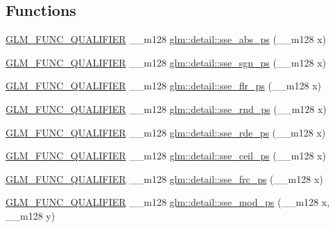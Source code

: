 \subsection*{Functions}
\begin{DoxyCompactItemize}
\item 
\hyperlink{setup_8hpp_a33fdea6f91c5f834105f7415e2a64407}{G\+L\+M\+\_\+\+F\+U\+N\+C\+\_\+\+Q\+U\+A\+L\+I\+F\+I\+ER} \+\_\+\+\_\+m128 \hyperlink{namespaceglm_1_1detail_a982958b357bf2f13229270c69be7b02b}{glm\+::detail\+::sse\+\_\+abs\+\_\+ps} (\+\_\+\+\_\+m128 x)
\item 
\hyperlink{setup_8hpp_a33fdea6f91c5f834105f7415e2a64407}{G\+L\+M\+\_\+\+F\+U\+N\+C\+\_\+\+Q\+U\+A\+L\+I\+F\+I\+ER} \+\_\+\+\_\+m128 \hyperlink{namespaceglm_1_1detail_a67933cf6687025e0841dce5f8ebe1892}{glm\+::detail\+::sse\+\_\+sgn\+\_\+ps} (\+\_\+\+\_\+m128 x)
\item 
\hyperlink{setup_8hpp_a33fdea6f91c5f834105f7415e2a64407}{G\+L\+M\+\_\+\+F\+U\+N\+C\+\_\+\+Q\+U\+A\+L\+I\+F\+I\+ER} \+\_\+\+\_\+m128 \hyperlink{namespaceglm_1_1detail_a3d303480575075ea1e56a02b19b2af8e}{glm\+::detail\+::sse\+\_\+flr\+\_\+ps} (\+\_\+\+\_\+m128 x)
\item 
\hyperlink{setup_8hpp_a33fdea6f91c5f834105f7415e2a64407}{G\+L\+M\+\_\+\+F\+U\+N\+C\+\_\+\+Q\+U\+A\+L\+I\+F\+I\+ER} \+\_\+\+\_\+m128 \hyperlink{namespaceglm_1_1detail_a3f07185bf2c0f4e6f6870b076d89d0c1}{glm\+::detail\+::sse\+\_\+rnd\+\_\+ps} (\+\_\+\+\_\+m128 x)
\item 
\hyperlink{setup_8hpp_a33fdea6f91c5f834105f7415e2a64407}{G\+L\+M\+\_\+\+F\+U\+N\+C\+\_\+\+Q\+U\+A\+L\+I\+F\+I\+ER} \+\_\+\+\_\+m128 \hyperlink{namespaceglm_1_1detail_a3d6f7ff87ee8764fa4a3c83ecf6a7a9e}{glm\+::detail\+::sse\+\_\+rde\+\_\+ps} (\+\_\+\+\_\+m128 x)
\item 
\hyperlink{setup_8hpp_a33fdea6f91c5f834105f7415e2a64407}{G\+L\+M\+\_\+\+F\+U\+N\+C\+\_\+\+Q\+U\+A\+L\+I\+F\+I\+ER} \+\_\+\+\_\+m128 \hyperlink{namespaceglm_1_1detail_a907280f32258c4f9657282bcd6527d60}{glm\+::detail\+::sse\+\_\+ceil\+\_\+ps} (\+\_\+\+\_\+m128 x)
\item 
\hyperlink{setup_8hpp_a33fdea6f91c5f834105f7415e2a64407}{G\+L\+M\+\_\+\+F\+U\+N\+C\+\_\+\+Q\+U\+A\+L\+I\+F\+I\+ER} \+\_\+\+\_\+m128 \hyperlink{namespaceglm_1_1detail_aa49360321556f8ee1d55bcf62f86f50e}{glm\+::detail\+::sse\+\_\+frc\+\_\+ps} (\+\_\+\+\_\+m128 x)
\item 
\hyperlink{setup_8hpp_a33fdea6f91c5f834105f7415e2a64407}{G\+L\+M\+\_\+\+F\+U\+N\+C\+\_\+\+Q\+U\+A\+L\+I\+F\+I\+ER} \+\_\+\+\_\+m128 \hyperlink{namespaceglm_1_1detail_a5a9835edaca654da44c7daae89ce5106}{glm\+::detail\+::sse\+\_\+mod\+\_\+ps} (\+\_\+\+\_\+m128 x, \+\_\+\+\_\+m128 y)

\end{DoxyCompactItemize}
